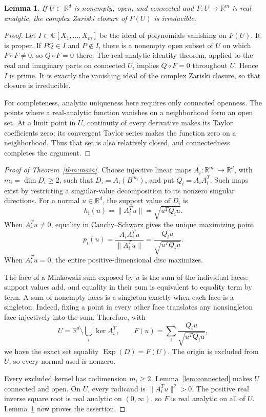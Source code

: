 \documentclass[11pt]{article}
\newtheorem{lemma}[theorem]{Lemma}
\newcommand{\Exp}{\operatorname{Exp}}
\newcommand{\R}{\mathbb R}
\newcommand{\C}{\mathbb C}
\begin{document}
\begin{lemma}\label{lem:analytic}
If \(U\subset\R^d\) is nonempty, open, and connected and
\(F:U\to\R^m\) is real analytic, the complex Zariski closure of
\(F(U)\) is irreducible.
\end{lemma}
\begin{proof}
Let \(I\subset\C[X_1,\ldots,X_m]\) be the ideal of polynomials
vanishing on \(F(U)\). It is proper. If \(PQ\in I\) and \(P\notin I\),
there is a nonempty open subset of \(U\) on which \(P\circ F\ne0\),
so \(Q\circ F=0\) there. The real-analytic identity theorem, applied
to the real and imaginary parts on connected \(U\), implies
\(Q\circ F=0\) throughout \(U\). Hence \(I\) is prime. It is exactly
the vanishing ideal of the complex Zariski closure, so that closure is
irreducible.

For completeness, analytic uniqueness here requires only connected
openness. The points where a real-analytic function vanishes on a
neighborhood form an open set. At a limit point in \(U\), continuity
of every derivative makes its Taylor coefficients zero; its convergent
Taylor series makes the function zero on a neighborhood. Thus that set
is also relatively closed, and connectedness completes the argument.
\end{proof}

\begin{proof}[Proof of Theorem~\ref{thm:main}]
Choose injective linear maps \(A_i:\R^{m_i}\to\R^d\), with
\(m_i=\dim D_i\ge2\), such that \(D_i=A_i(B^{m_i})\), and put
\(Q_i=A_iA_i^T\). Such maps exist by restricting a singular-value
decomposition to its nonzero singular directions.
For a normal \(u\in\R^d\), the support value of \(D_i\) is
\[
 h_i(u)=\|A_i^Tu\|=\sqrt{u^TQ_i u}.
\]
When \(A_i^Tu\ne0\), equality in Cauchy--Schwarz gives the unique
maximizing point
\begin{equation}\label{eq:point}
 p_i(u)=\frac{A_iA_i^Tu}{\|A_i^Tu\|}
       =\frac{Q_i u}{\sqrt{u^TQ_i u}}.
\end{equation}
When \(A_i^Tu=0\), the entire positive-dimensional disc maximizes.

The face of a Minkowski sum exposed by \(u\) is the sum of the
individual faces: support values add, and equality in their sum is
equivalent to equality term by term. A sum of nonempty faces is a
singleton exactly when each face is a singleton. Indeed, fixing a
point in every other face translates any nonsingleton face injectively
into the sum. Therefore, with
\begin{equation}\label{eq:map}
 U=\R^d\setminus\bigcup_i\ker A_i^T,
 \qquad F(u)=\sum_i\frac{Q_i u}{\sqrt{u^TQ_i u}},
\end{equation}
we have the exact set equality \(\Exp(D)=F(U)\). The origin is excluded
from \(U\), so every normal used is nonzero.

Every excluded kernel has codimension \(m_i\ge2\).
Lemma~\ref{lem:connected} makes \(U\) connected and open. On \(U\),
every radicand is \(\|A_i^Tu\|^2>0\). The positive real inverse square
root is real analytic on \((0,\infty)\), so \(F\) is real analytic on
all of \(U\). Lemma~\ref{lem:analytic} now proves the assertion.
\end{proof}
\end{document}

